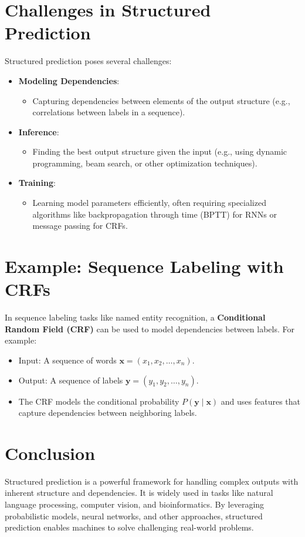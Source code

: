 \begin{notechapter}
\section{Challenges in Structured Prediction}
Structured prediction poses several challenges:
\begin{itemize}
  \item \textbf{Modeling Dependencies}:
    \begin{itemize}
      \item Capturing dependencies between elements of the output 
        structure (e.g., correlations between labels in a sequence).
    \end{itemize}
  \item \textbf{Inference}:
    \begin{itemize}
      \item Finding the best output structure given the input (e.g., 
        using dynamic programming, beam search, or other optimization 
        techniques).
    \end{itemize}
  \item \textbf{Training}:
    \begin{itemize}
      \item Learning model parameters efficiently, often requiring 
        specialized algorithms like backpropagation through time 
        (BPTT) for RNNs or message passing for CRFs.
    \end{itemize}
\end{itemize}

\section{Example: Sequence Labeling with CRFs}
In sequence labeling tasks like named entity recognition, a 
\textbf{Conditional Random Field (CRF)} can be used to model 
dependencies between labels. For example:
\begin{itemize}
  \item Input: A sequence of words \( \mathbf{x} = (x_1, x_2, \dots, 
    x_n) \).
  \item Output: A sequence of labels \( \mathbf{y} = (y_1, y_2, \dots, 
    y_n) \).
  \item The CRF models the conditional probability \( P(\mathbf{y} 
    \mid \mathbf{x}) \) and uses features that capture dependencies 
    between neighboring labels.
\end{itemize}

\section{Conclusion}
Structured prediction is a powerful framework for handling complex 
outputs with inherent structure and dependencies. It is widely used in 
tasks like natural language processing, computer vision, and 
bioinformatics. By leveraging probabilistic models, neural networks, 
and other approaches, structured prediction enables machines to solve 
challenging real-world problems.
\end{notechapter}
